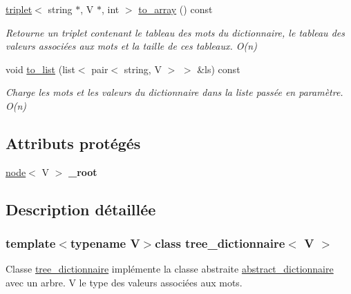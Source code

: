 \begin{DoxyCompactItemize}
\hyperlink{structtriplet}{triplet}$<$ string $\ast$, V $\ast$, int $>$ \hyperlink{classtree__dictionnaire_a1a5c6cd5954ceac7adbd09eb390f610c}{to\-\_\-array} () const 
\begin{DoxyCompactList}\small\item\em Retourne un triplet contenant le tableau des mots du dictionnaire, le tableau des valeurs associées aux mots et la taille de ces tableaux. O(n) \end{DoxyCompactList}\item 
void \hyperlink{classtree__dictionnaire_a5e251a8b18b85bf416729ddde96242b6}{to\-\_\-list} (list$<$ pair$<$ string, V $>$ $>$ \&ls) const 
\begin{DoxyCompactList}\small\item\em Charge les mots et les valeurs du dictionnaire dans la liste passée en paramètre. O(n) \end{DoxyCompactList}\end{DoxyCompactItemize}
\subsection*{Attributs protégés}
\begin{DoxyCompactItemize}
\item 
\hypertarget{classtree__dictionnaire_a6b4a30e7db9751d74526dd3569679b99}{\hyperlink{classnode}{node}$<$ V $>$ {\bfseries \-\_\-root}}\label{classtree__dictionnaire_a6b4a30e7db9751d74526dd3569679b99}

\end{DoxyCompactItemize}


\subsection{Description détaillée}
\subsubsection*{template$<$typename V$>$class tree\-\_\-dictionnaire$<$ V $>$}

Classe \hyperlink{classtree__dictionnaire}{tree\-\_\-dictionnaire} implémente la classe abstraite \hyperlink{classabstract__dictionnaire}{abstract\-\_\-dictionnaire} avec un arbre. V le type des valeurs associées aux mots. 

